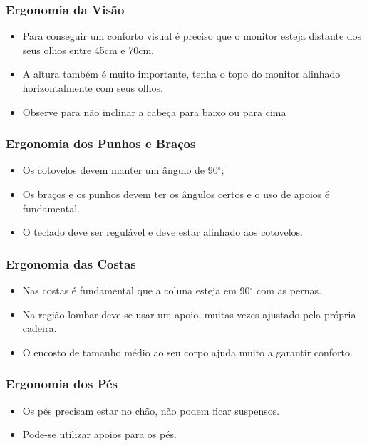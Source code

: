 \documentclass[aspectratio=169]{beamer} %
\begin{document}
\begin{frame}
	\frametitle{Ergonomia da Visão}
	
	\begin{itemize}
		\item Para conseguir um conforto visual é preciso que o monitor esteja distante dos seus olhos entre 45cm e 70cm. 
		\item A altura também é muito importante, tenha o topo do monitor alinhado horizontalmente com seus olhos. 
		\item Observe para não inclinar a cabeça para baixo ou para cima
	\end{itemize}
\end{frame}

\begin{frame}
	\frametitle{Ergonomia dos Punhos e Braços}
	
	\begin{itemize}
		\item Os cotovelos devem manter um ângulo de 90$^{\circ}$;
		\item Os braços e os punhos devem ter os ângulos certos e o uso de apoios é fundamental. 
		\item O teclado deve ser regulável e deve estar alinhado aos cotovelos.
	\end{itemize}
\end{frame}

\begin{frame}
	\frametitle{Ergonomia das Costas}
	
	\begin{itemize}
		\item Nas costas é fundamental que a coluna esteja em 90$^{\circ}$ com as pernas. 
		\item Na região lombar deve-se usar um apoio, muitas vezes ajustado pela própria cadeira. 
		\item O encosto de tamanho médio ao seu corpo ajuda muito a garantir conforto.
	\end{itemize}
\end{frame}

\begin{frame}
	\frametitle{Ergonomia dos Pés}
	
	\begin{itemize}
		\item Os pés precisam estar no chão, não podem ficar suspensos. 
		\item Pode-se utilizar apoios para os pés. 
	\end{itemize}
\end{frame}
\end{document}
